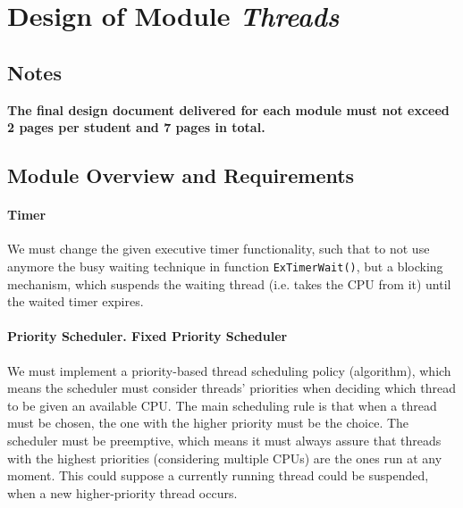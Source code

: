 
\chapter{Design of Module \textit{Threads}}

\renewcommand{\taskA}{\textit{Timer}}
\renewcommand{\taskB}{\textit{Priority Scheduler. Fixed Priority Scheduler}}
\renewcommand{\taskC}{\textit{Priority Scheduler. Priority Donation}}

\section*{Notes}

\textbf{The final design document delivered for each module must not exceed 2 pages per student and 7 pages in total.}

\section{Module Overview and Requirements}

\subsubsection{Timer}

We must change the given executive timer functionality, such that to not use anymore the busy waiting technique in
function \lstinline|ExTimerWait()|, but a blocking mechanism, which suspends the waiting thread (i.e. takes the CPU from it) until the waited timer expires.

\subsubsection{Priority Scheduler. Fixed Priority Scheduler}
\label{subsubsec:prio-sched}

We must implement a priority-based thread scheduling policy (algorithm), which means the scheduler must consider threads'
priorities when deciding which thread to be given an available CPU. The main scheduling rule is that when a thread must
be chosen, the one with the higher priority must be the choice. 
The scheduler must be preemptive, which means it must always assure that threads with the highest priorities (considering multiple CPUs)
are the ones run at any moment. This could suppose a currently running thread could be suspended, when a new higher-priority thread occurs. 

